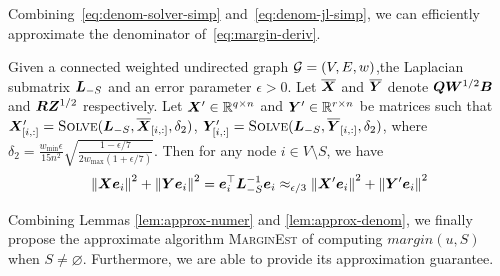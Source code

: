 \documentclass[sigconf]{acmart}
\begin{document}
Combining~\eqref{eq:denom-solver-simp} and~\eqref{eq:denom-jl-simp}, we can efficiently approximate the denominator of~\eqref{eq:margin-deriv}.
\begin{lemma}\label{lem:approx-denom}
    Given a connected weighted undirected graph \(\mathcal{G}=(V,E,w)\),the Laplacian submatrix \(\boldsymbol{L}_{-S}\) and an error parameter \(\epsilon>0\).
    Let \(\overline{\boldsymbol{X}}\) and \(\overline{\boldsymbol{Y}}\) denote \(\boldsymbol{Q}\boldsymbol{W}^{1/2}\boldsymbol{B}\) and \(\boldsymbol{R}\boldsymbol{Z}^{1/2}\) respectively.
    Let \(\boldsymbol{X}'\in\mathbb{R}^{q\times n}\) and \(\boldsymbol{Y}'\in\mathbb{R}^{r\times n}\) be matrices such that \(\boldsymbol{X}'_{[i,:]}=\textsc{Solve}(\boldsymbol{L}_{-S},\overline{\boldsymbol{X}}_{[i,:]},\delta_2)\), \(\boldsymbol{Y}'_{[i,:]}=\textsc{Solve}(\boldsymbol{L}_{-S},\overline{\boldsymbol{Y}}_{[i,:]},\delta_2)\), where \(\delta_2=\frac{w_{\min}\epsilon}{15n^2}\sqrt{\frac{1-\epsilon/7}{2w_{\max}(1+\epsilon/7)}}\). Then for any node \(i\in V\setminus S\), we have
    \begin{equation}\label{eq:approx-denom}
        \left\Vert\boldsymbol{X}\boldsymbol{e}_i\right\Vert^2+\left\Vert\boldsymbol{Y}\boldsymbol{e}_i\right\Vert^2=\boldsymbol{e}_i^\top\boldsymbol{L}_{-S}^{-1}\boldsymbol{e}_i\approx_{\epsilon/3}\left\Vert\boldsymbol{X}'\boldsymbol{e}_i\right\Vert^2+\left\Vert\boldsymbol{Y}'\boldsymbol{e}_i\right\Vert^2
    \end{equation}
\end{lemma}


Combining Lemmas \ref{lem:approx-numer} and \ref{lem:approx-denom}, we finally propose the approximate algorithm \textsc{MarginEst} of computing \(margin(u,S)\) when \(S\neq\varnothing\). Furthermore, we are able to provide its approximation guarantee.
\end{document}
